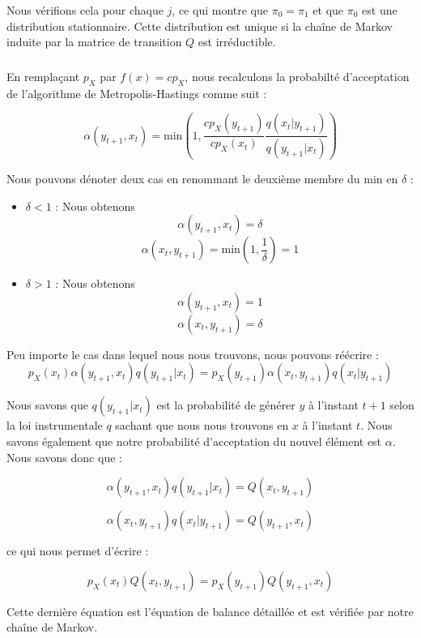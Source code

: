 Nous vérifions cela pour chaque $j$, ce qui montre que $\pi_0 = \pi_1$ et que $\pi_0$ est une distribution stationnaire. Cette distribution est unique si la chaîne de Markov induite par la matrice de transition $Q$ est irréductible. 

\subsubsection{}
En remplaçant $p_X$ par $f(x) = cp_X$, nous recalculons la probabilté d'acceptation de l'algorithme de Metropolis-Hastings comme suit :

\begin{equation*}
  \alpha(y_{t+1},x_t) = \text{min}(1,\frac{cp_X(y_{t+1})}{cp_X(x_t)}\frac{q(x_t|y_{t+1})}{q(y_{t+1}|x_t)})
\end{equation*}

Nous pouvons dénoter deux cas en renommant le deuxième membre du min en $\delta$ : 

\begin{itemize}
  \item $\delta < 1$ : Nous obtenons 
  \begin{equation*}
    \alpha(y_{t+1},x_t) = \delta
  \end{equation*}
  \begin{equation*}
    \alpha(x_t,y_{t+1}) = \text{min}(1,\frac{1}{\delta}) = 1
  \end{equation*}
  \item $\delta > 1$ : Nous obtenons
  \begin{equation*}
    \alpha(y_{t+1},x_t) = 1
  \end{equation*}
  \begin{equation*}
    \alpha(x_t,y_{t+1}) = \delta
  \end{equation*}
\end{itemize}

Peu importe le cas dans lequel nous nous trouvons, nous pouvons réécrire :
\begin{equation*}
  p_X(x_t)\alpha(y_{t+1},x_t)q(y_{t+1}|x_t) = p_X(y_{t+1})\alpha(x_t,y_{t+1})q(x_t|y_{t+1})
\end{equation*}

Nous savons que $q(y_{t+1}|x_t)$ est la probabilité de générer $y$ à l'instant $t+1$ selon la loi instrumentale $q$ sachant que nous nous trouvons en $x$ à l'instant $t$. Nous savons 
également que notre probabilité d'acceptation du nouvel élément est $\alpha$. Nous savons donc que :

\begin{equation*}
  \alpha(y_{t+1},x_t)q(y_{t+1}|x_t) = Q(x_t,y_{t+1})
\end{equation*}

\begin{equation*}
  \alpha(x_t,y_{t+1})q(x_t|y_{t+1}) = Q(y_{t+1},x_t)
\end{equation*}

ce qui nous permet d'écrire :

\begin{equation*}
  p_X(x_t)Q(x_t,y_{t+1}) = p_X(y_{t+1})Q(y_{t+1},x_t)
\end{equation*}

Cette dernière équation est l'équation de balance détaillée et est vérifiée par notre chaîne de Markov.